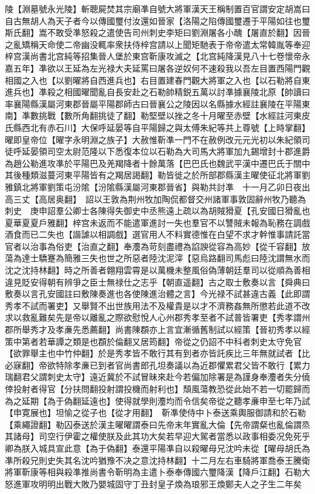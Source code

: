 陵【淵墓號永光陵】斬聰屍焚其宗廟凖自號大將軍漢天王稱制置百官謂安定胡嵩曰自古無胡人為天子者今以傳國璽付汝還如晉家【洛陽之陷傳國璽遷于平陽如往也璽斯氏翻】嵩不敢受凖怒殺之遣使告司州刺史李矩曰劉淵屠各小醜【屠直於翻】因晉之亂矯稱天命使二帝幽没輒率衆扶侍梓宫請以上聞矩馳表于帝帝遣太常韓胤等奉迎梓宫漢尚書北宫純等招集晉人堡於東宫靳康攻滅之【北宫純降漢見八十七卷懷帝永嘉五年】凖欲以王延為左光禄大夫延罵曰屠各逆奴何不速殺我以吾左目置西陽門觀相國之入也【以劉曜將自西進兵也】右目置建春門觀大將軍之入也【以石勒將自東進兵也】凖殺之相國曜聞亂自長安赴之石勒帥精鋭五萬以討凖據襄陵北原【帥讀曰率襄陽縣漢屬河東郡晉屬平陽郡師古曰晉襄公之陵因以名縣據水經註襄陵在平陽東南】凖數挑戰【數所角翻挑徒了翻】勒堅壁以挫之冬十月曜至赤壁【水經註河東皮氏縣西北有赤石川】大保呼延晏等自平陽歸之與太傅朱紀等共上尊號【上時掌翻】曜即皇帝位【曜字永明淵之族子】大赦惟靳凖一門不在赦例改元元光初以朱紀領司徒呼延晏領司空太尉范隆以下悉復本位以石勒為大司馬大將軍加九錫增封十郡進爵為趙公勒進攻凖於平陽巴及羌羯降者十餘萬落【巴巴氏也魏武平漢中遷巴氏于關中其後種類滋蔓河東平陽皆有之羯居謁翻】勒皆徙之於所部郡縣漢主曜使征北將軍劉雅鎮北將軍劉策屯汾隂【汾隂縣漢屬河東郡晉省】與勒共討凖　十一月乙卯日夜出高三丈【高居奥翻】　詔以王敦為荆州牧加陶侃都督交州諸軍事敦固辭州牧乃聽為刺史　庚申詔羣公卿士各陳得失御史中丞熊遠上疏以為胡賊猾夏【孔安國日猾亂也夏華夏夏戶雅翻】梓宫未返而不能遣軍進討一失也羣官不以讐賊未報為恥務在調戲酒食而已二失也【諧謔以相調戲】選官用人不料實德惟在白望不求才幹惟事請託當官者以治事為俗吏【治直之翻】奉灋為苛刻盡禮為諂諛從容為高妙【從千容翻】放蕩為達士驕蹇為簡雅三失也世之所惡者陸沈泥滓【惡烏路翻司馬彪曰陸沈謂無水而沈之沈持林翻】時之所善者翺翔雲霄是以萬機未整風俗偽薄朝廷羣司以從順為善相違見貶安得朝有辨爭之臣士無禄仕之志乎【朝直遥翻】古之取士敷奏以言【舜典曰敷奏以言孔安國註曰敷陳奏進也各使陳進治體之言】今光禄不試甚違古義【此即謂秀孝不試而署吏】又舉賢不出世族用法不及權貴是以才不濟務姦無所懲若此道不改求以救亂難矣先是帝以離亂之際欲慰悅人心州郡秀孝至者不試普皆署吏【秀孝謂州郡所舉秀才及孝亷先悉薦翻】尚書陳頵亦上言宜漸循舊制試以經策【晉初秀孝以經策中第者若華譚之類是也頵於倫翻又居筠翻】帝從之仍詔不中科者刺史太守免官【欲罪舉主也中竹仲翻】於是秀孝皆不敢行其有到者亦皆託疾比三年無就試者【比必寐翻】帝欲特除孝亷已到者官尚書郎孔坦奏議以為近郡懼累君父皆不敢行【累力瑞翻君父謂刺史太守】遠近冀於不試冒昧來赴今若偏加除署是為謹身奉灋者失分僥倖投射者得官【分扶問翻投射謂投機而射利也】頹風蕩教恐從此始不若一切罷歸而為之延期【為于偽翻延遠也】使得就學則灋均而令信矣帝從之聽孝亷申至七年乃試【申寛展也】坦愉之從子也【從才用翻】　靳凖使侍中卜泰送乘輿服御請和於石勒【乘繩證翻】勒囚泰送於漢主曜曜謂泰曰先帝末年實亂大倫【先帝謂粲也亂倫謂烝其諸母】司空行伊霍之權使朕及此其功大矣若早迎大駕者當悉以政事相委况免死乎卿為朕入城具宣此意【為于偽翻】泰還平陽凖自以殺曜母兄沈吟未從【曜母胡氏為凖所殺兄則史失其名沈吟猶豫不决之意沈持林翻】十二月左右車騎將軍喬泰王騰衛將軍靳康等相與殺凖推尚書令靳明為主遣卜泰奉傳國六璽降漢【降戶江翻】石勒大怒進軍攻明明出戰大敗乃嬰城固守丁丑封皇子煥為琅邪王煥鄭夫人之子生二年矣

